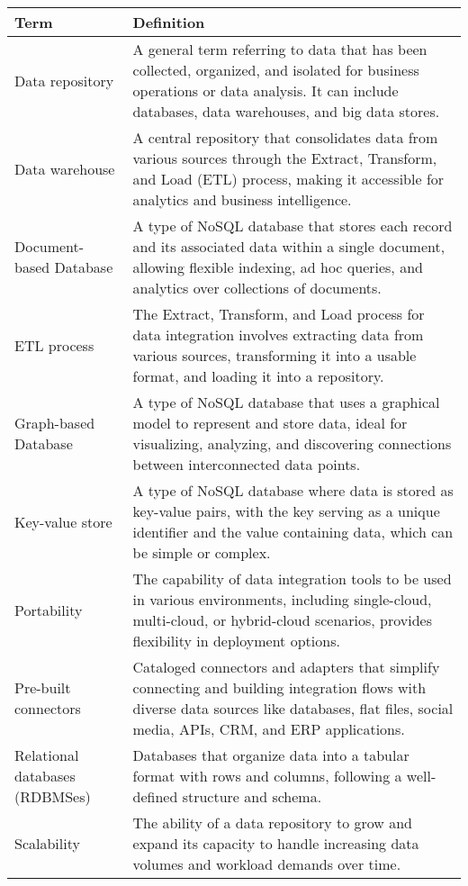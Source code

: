 \documentclass[12pt]{report} %
\begin{document}
	\begin{table}[h!]
	\centering
	\begin{tabular}{| m{5cm} | m{10cm} |}
		\hline
		\textbf{Term} & \textbf{Definition} \\
			\hline
			 Data repository & A general term referring to data that has been collected, organized, and isolated for business operations or data analysis. It can include databases, data warehouses, and big data stores. \\
			\hline
			 Data warehouse & A central repository that consolidates data from various sources through the Extract, Transform, and Load (ETL) process, making it accessible for analytics and business intelligence. \\
			\hline
			 Document-based Database & A type of NoSQL database that stores each record and its associated data within a single document, allowing flexible indexing, ad hoc queries, and analytics over collections of documents. \\
			\hline
			 ETL process & The Extract, Transform, and Load process for data integration involves extracting data from various sources, transforming it into a usable format, and loading it into a repository. \\
			\hline
			 Graph-based Database & A type of NoSQL database that uses a graphical model to represent and store data, ideal for visualizing, analyzing, and discovering connections between interconnected data points. \\
			\hline
			 Key-value store & A type of NoSQL database where data is stored as key-value pairs, with the key serving as a unique identifier and the value containing data, which can be simple or complex. \\
			\hline
			 Portability & The capability of data integration tools to be used in various environments, including single-cloud, multi-cloud, or hybrid-cloud scenarios, provides flexibility in deployment options.\\
			\hline
			 Pre-built connectors & Cataloged connectors and adapters that simplify connecting and building integration flows with diverse data sources like databases, flat files, social media, APIs, CRM, and ERP applications. \\
			\hline
			 Relational databases (RDBMSes) & Databases that organize data into a tabular format with rows and columns, following a well-defined structure and schema.\\
			\hline
			 Scalability & The ability of a data repository to grow and expand its capacity to handle increasing data volumes and workload demands over time. \\

\end{tabular}
\end{table}
\end{document}
